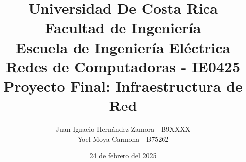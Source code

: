 


\title{ {\Huge Universidad De Costa Rica} \\
        {\LARGE Facultad de Ingeniería} \\
        {\LARGE Escuela de Ingeniería Eléctrica} \\ \vspace{3.5cm}
        {\LARGE Redes de Computadoras - IE0425} \\
        {\LARGE Proyecto Final: Infraestructura de Red}\\ \vspace{2.5cm}
}

\author{ {\Large Juan Ignacio Hernández Zamora - B9XXXX} \\ 
         {\Large Yoel Moya Carmona - B75262} \\ \vspace{3cm}
}

\date{24 de febrero del 2025}





\begin{titlingpage}
    \maketitle
\end{titlingpage}


\tableofcontents
\clearpage{\pagestyle{empty}}








\printbibliography[title={Referencias}]


